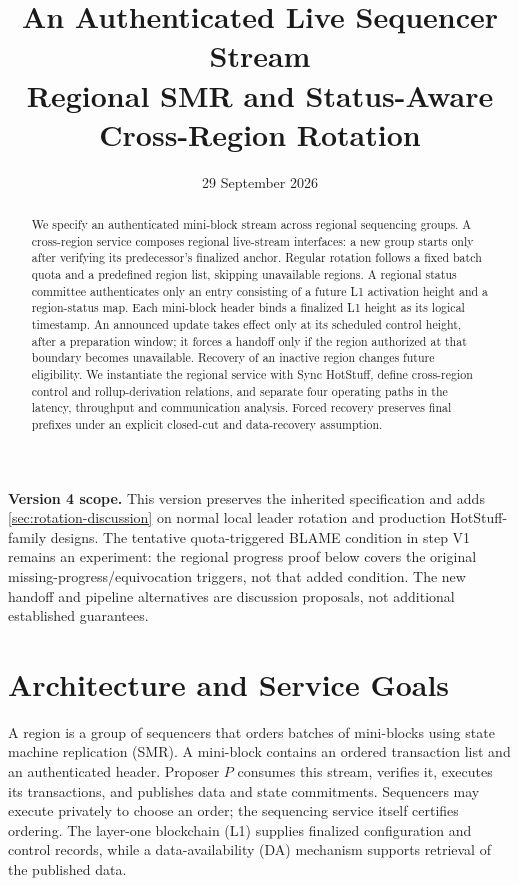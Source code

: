 \documentclass[11pt,a4paper,onecolumn]{article}
\title{An Authenticated Live Sequencer Stream\\
\large Regional SMR and Status-Aware Cross-Region Rotation}
\author{}\date{29 September 2026}
\begin{document}
\maketitle
\begin{abstract}
We specify an authenticated mini-block stream across regional sequencing
groups. A cross-region service composes regional live-stream interfaces:
a new group starts only after verifying its predecessor's finalized anchor.
Regular rotation follows a fixed batch quota and a predefined region list,
skipping unavailable regions. A regional status committee authenticates only
an entry consisting of a future L1 activation height and a region-status
map. Each mini-block header binds a finalized L1 height as its logical
timestamp. An announced update takes effect only at its scheduled control
height, after a preparation window; it forces a handoff only if the region
authorized at that boundary becomes unavailable. Recovery of an inactive
region changes future eligibility. We instantiate
the regional service with Sync HotStuff, define cross-region control and
rollup-derivation relations, and separate four operating paths in the latency,
throughput and communication analysis. Forced recovery preserves final
prefixes under an explicit closed-cut and data-recovery assumption.
\end{abstract}

\noindent\textbf{Version 4 scope.}
This version preserves the inherited specification and adds
\cref{sec:rotation-discussion} on normal local leader rotation and production
HotStuff-family designs. The tentative quota-triggered BLAME condition in
step V1 remains an experiment: the regional progress proof below covers the
original missing-progress/equivocation triggers, not that added condition.
The new handoff and pipeline alternatives are discussion proposals, not
additional established guarantees.

\section{Architecture and Service Goals}\label{sec:architecture}
A region is a group of sequencers that orders batches of mini-blocks using
state machine replication (SMR). A mini-block contains an ordered transaction
list and an authenticated header. Proposer $P$ consumes this stream, verifies
it, executes its transactions, and publishes data and state commitments.
Sequencers may execute privately to choose an order; the sequencing service
itself certifies ordering. The layer-one blockchain (L1) supplies finalized
configuration and control records, while a data-availability (DA) mechanism
supports retrieval of the published data.
\end{document}
